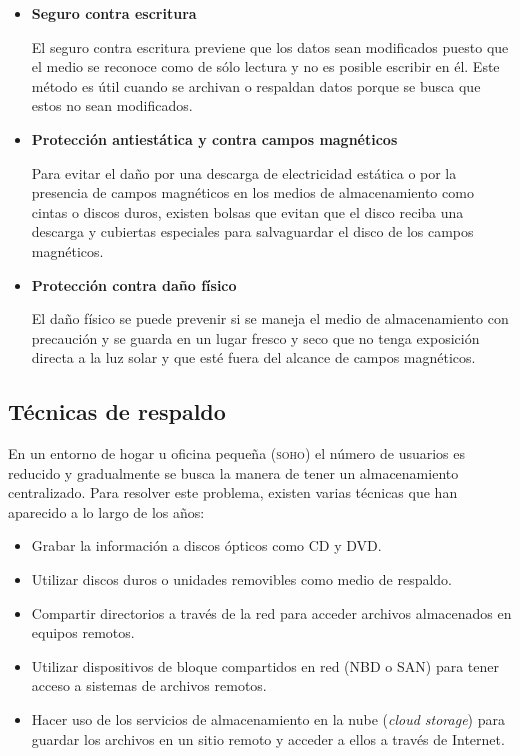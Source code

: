     \begin{itemize}

      \item \textbf{Seguro contra escritura}

El seguro contra escritura previene que los datos sean modificados puesto que el medio se reconoce como de s\'{o}lo lectura y no es posible escribir en \'{e}l. Este m\'{e}todo es \'{u}til cuando se archivan o respaldan datos porque se busca que estos no sean modificados.

      \item \textbf{Protecci\'{o}n antiest\'{a}tica y contra campos magn\'{e}ticos}

Para evitar el da\~{n}o por una descarga de electricidad est\'{a}tica o por la presencia de campos magn\'{e}ticos en los medios de almacenamiento como cintas o discos duros, existen bolsas que evitan que el disco reciba una descarga y cubiertas especiales para salvaguardar el disco de los campos magn\'{e}ticos.

      \item \textbf{Protecci\'{o}n contra da\~{n}o f\'{i}sico}

El da\~{n}o f\'{i}sico se puede prevenir si se maneja el medio de almacenamiento con precauci\'{o}n y se guarda en un lugar fresco y seco que no tenga exposici\'{o}n directa a la luz solar y que est\'{e} fuera del alcance de campos magn\'{e}ticos.

    \end{itemize}

  \subsection {T\'{e}cnicas de respaldo}


En un entorno de hogar u oficina peque\~{n}a (\textsc{soho}) el n\'{u}mero de usuarios es reducido y gradualmente se busca la manera de tener un almacenamiento centralizado. Para resolver este problema, existen varias t\'{e}cnicas que han aparecido a lo largo de los a\~{n}os:

    \begin{itemize}
      \item Grabar la informaci\'{o}n a discos \'{o}pticos como CD y DVD.
      \item Utilizar discos duros o unidades removibles como medio de respaldo.
      \item Compartir directorios a trav\'{e}s de la red para acceder archivos almacenados en equipos remotos.
      \item Utilizar dispositivos de bloque compartidos en red (\textsc{NBD} o \textsc{SAN}) para tener acceso a sistemas de archivos remotos.
      \item Hacer uso de los servicios de almacenamiento en la nube (\textit{cloud storage}) para guardar los archivos en un sitio remoto y acceder a ellos a trav\'{e}s de Internet.
    \end{itemize}

